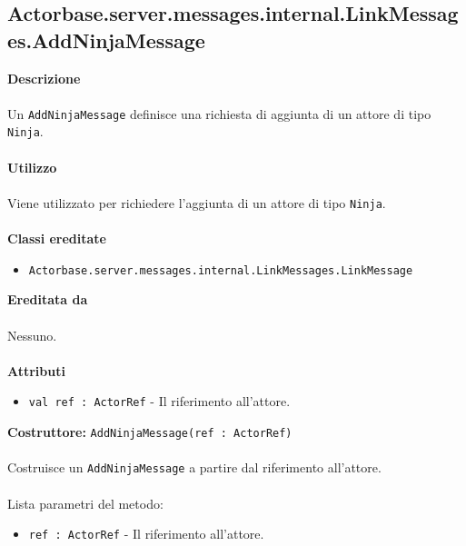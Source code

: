 \documentclass[a4paper]{article}
\begin{document}
	\subsection{Actorbase.server.messages.internal.LinkMessages.AddNinjaMessage}
		\textbf{Descrizione}
			\\ \\
			Un \texttt{AddNinjaMessage} definisce una richiesta di aggiunta di un attore di tipo \texttt{Ninja}.
			\\ \\
		\textbf{Utilizzo}
			\\ \\
			Viene utilizzato per richiedere l'aggiunta di un attore di tipo \texttt{Ninja}.
			\\ \\
		\textbf{Classi ereditate}
			\begin{itemize}
				\item \texttt{Actorbase.server.messages.internal.LinkMessages.LinkMessage}
			\end{itemize}
		\textbf{Ereditata da}
			\\ \\
			Nessuno.
			\\ \\
		\textbf{Attributi}
			\begin{itemize}
				\item \texttt{val ref : ActorRef} - Il riferimento all'attore.
			\end{itemize}
		\textbf{Costruttore:} \texttt{AddNinjaMessage(ref : ActorRef)}
		\\ \\
		Costruisce un \texttt{AddNinjaMessage} a partire dal riferimento all'attore.
		\\ \\
		Lista parametri del metodo:
			\begin{itemize}
				\item \texttt{ref : ActorRef} - Il riferimento all'attore.
			\end{itemize}
			
\end{document}
